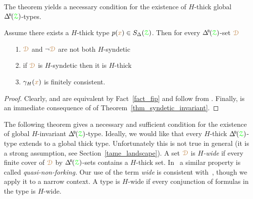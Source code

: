 


The theorem yields a necessary condition for the existence of $H$-thick global $\BDelta({\grZ})$-types.

\begin{corollary}\label{corol_def_mu}
  Assume there exists a $H$-thick type $p({\color{brown} x})\in S_\Delta({\color{green}\EuScript Z})$.
  Then for every $\BDelta({\grZ})$-set ${\color{brown}\EuScript D}$
  \begin{itemize}
    \item[1.] ${\color{brown}\EuScript D}$ and $\neg{\color{brown}\EuScript D}$ are not both $H$-syndetic
    \item[2.] if ${\color{brown}\EuScript D}$ is $H$-syndetic then it is $H$-thick
    \item[3.] $\gamma_H({\color{brown} x})$ is finitely consistent.\smallskip
  \end{itemize}
\end{corollary}

\begin{proof}
  Clearly,  and  are equivalent by Fact~\ref{fact_fip} and follow from .
  Finally,  is an immediate consequence of  of Theorem~\ref{thm_syndetic_invariant}.
\end{proof}

The following theorem gives a necessary and sufficient condition for the  existence of global $H$-invariant $\BDelta({\grZ})$-type.
Ideally, we would like that every $H$-thick $\BDelta({\grZ})$-type extends to a global thick type.
Unfortunately this is not true in general (it is a strong assumption, see Section~\ref{tame_landscape}).
A set ${\color{brown}\EuScript D}$ is \emph{$H$-wide\/} if every finite cover of ${\color{brown}\EuScript D}$ by $\BDelta({\grZ})$-sets contains a $H$-thick set.
In~\cite{CK} a similar property is called \textit{quasi-non-forking.}
Our use of the term \textit{wide\/} is consistent with~\cite{Hr}, though we apply it to a narrow context.
A type is $H$-wide if every conjunction of formulas in the type is $H$-wide.

